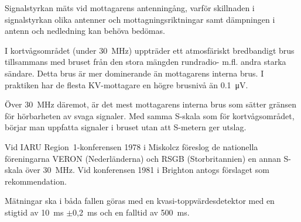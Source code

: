 \newpage

Signalstyrkan mäts vid mottagarens antenningång, varför skillnaden i
signalstyrkan olika antenner och mottagningsriktningar samt dämpningen
i antenn och nedledning kan behöva bedömas.

I kortvågsområdet (under \SI{30}{\mega\hertz}) uppträder ett atmosfäriskt
bredbandigt brus tillsammans med bruset från den stora mängden rundradio- m.fl.
andra starka sändare.
Detta brus är mer dominerande än mottagarens interna brus.
I praktiken har de flesta KV-mottagare en högre brusnivå än
\SI{0,1}{\micro\volt}.

Över \SI{30}{\mega\hertz} däremot, är det mest mottagarens interna brus som
sätter gränsen för hörbarheten av svaga signaler.
Med samma S-skala som för kortvågsområdet, börjar man uppfatta signaler i
bruset utan att S-metern ger utslag.

Vid IARU Region~1-konferensen 1978 i Miskolcz föreslog de nationella
föreningarna VERON (Nederländerna) och RSGB (Storbritannien) en annan
S-skala över \SI{30}{\mega\hertz}.
Vid konferensen 1981 i Brighton antogs förslaget som rekommendation.

Mätningar ska i båda fallen göras med en kvasi-toppvärdesdetektor
med en stigtid av 10~ms \(\pm\)0,2~ms och en falltid av \SI{500}{\milli\second}.

